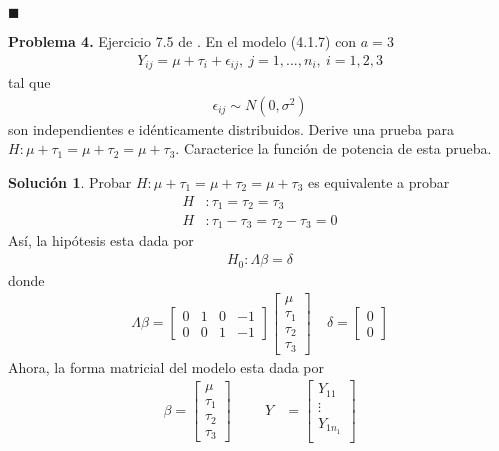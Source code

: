 \documentclass[12pt]{article}
\theoremstyle{plain}
\theoremstyle{definition}
\theoremstyle{definition}
\theoremstyle{definition}
\newtheorem*{solution}{Solución}
\begin{document}
\begin{flushright}
$\blacksquare$
\end{flushright}
\noindent \textbf{Problema 4.} Ejercicio 7.5 de \cite{ravishanker2001first}. En el modelo (4.1.7) con $a=3$ 
\begin{align*}
Y_{ij} = \mu + \tau_i + \epsilon_{ij},\ j = 1, ..., n_i , \ i = 1, 2, 3
\end{align*}
tal que
\begin{align*}
\epsilon_{ij}\sim N(0, \sigma^2)
\end{align*}
son independientes e idénticamente distribuidos. Derive una prueba para $H: \mu + \tau_1 = \mu + \tau_2 = \mu + \tau_3$. Caracterice la función de potencia de esta prueba. 
\begin{solution}
Probar $H: \mu + \tau_1 = \mu + \tau_2 = \mu + \tau_3$ es equivalente a probar
\begin{align*}
H &:\tau_1 = \tau_2 = \tau_3\\
H &:\tau_1 - \tau_3 =\tau_2-\tau_3 = 0
\end{align*}
Así, la hipótesis esta dada por  
\begin{align*}
H_0: \Lambda\beta = \delta
\end{align*}
donde 
\begin{align*}
\Lambda\beta =\begin{bmatrix}
0&1&0&-1\\
0&0&1&-1
\end{bmatrix}\begin{bmatrix}
\mu\\
\tau_1\\
\tau_2\\
\tau_3
\end{bmatrix} \ \ \ \ \
\delta =\begin{bmatrix}
0\\
0
\end{bmatrix}
\end{align*}
Ahora, la forma matricial del modelo esta dada por
\begin{align*}
    \beta = \begin{bmatrix}
       \mu \\ \tau_1 \\ \tau_2 \\ \tau_3
    \end{bmatrix} \hspace{1cm}
    Y &= \begin{bmatrix}
       Y_{11} \\ \vdots \\ Y_{1n_1} \\ 

\end{bmatrix}
\end{align*}
\end{solution}
\end{document}
